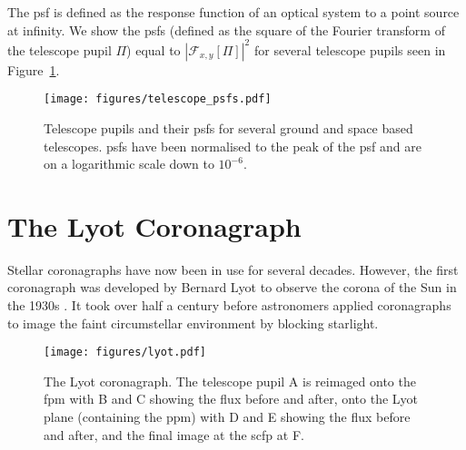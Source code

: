 \documentclass[letterpaper]{ar-1col}
\begin{document}



The \ac{psf} is defined as the response function of an optical system to a point source at infinity.
%
We show the \acp{psf} (defined as the square of the Fourier transform of the telescope pupil $\Pi$) equal to $|\mathcal{F}_{x,y}[\Pi]|^2$ for several telescope pupils seen in Figure~\ref{fig:telpsfs}.

\begin{figure}[ht]
  \centering
  \texttt{[image: figures/telescope\_psfs.pdf]}
  \caption{Telescope pupils and their \acp{psf} for several ground and space based telescopes.
  \acp{psf} have been normalised to the peak of the \ac{psf} and are on a logarithmic scale down to $10^{-6}$.}
  \label{fig:telpsfs}
\end{figure}


\section{The Lyot Coronagraph}

Stellar coronagraphs have now been in use for several decades.
%
However, the first coronagraph was developed by Bernard Lyot to observe the corona of the Sun in the 1930s \citep{Lyot39}.
%
It took over half a century before astronomers applied coronagraphs to image the faint circumstellar environment by blocking starlight. 

\begin{figure}[ht]
  \centering
  \texttt{[image: figures/lyot.pdf]}
  \caption{The Lyot coronagraph.
  The telescope pupil A is reimaged onto the \acl{fpm} with B and C showing the flux before and after, onto the Lyot plane (containing the \acl{ppm}) with D and E showing the flux before and after, and the final image at the \acl{scfp} at F.}
  \label{fig:lyot}
\end{figure}
\end{document}
